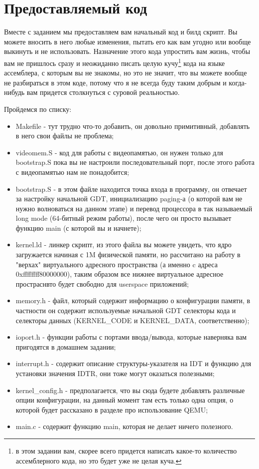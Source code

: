 \section{Предоставляемый код}

Вместе с заданием мы предоставляем вам начальный код и билд скрипт. Вы можете
вносить в него любые изменения, пытать его как вам угодно или вообще выкинуть и
не использовать. Назначение этого кода упростить вам жизнь, чтобы вам не
пришлось сразу и неожиданно писать целую кучу\footnote{в этом задании вам,
скорее всего придется написать какое-то количество ассемблерного кода, но это
будет уже не целая куча.} кода на языке ассемблера, с которым вы не знакомы, но
это не значит, что вы можете вообще не разбираться в этом коде, потому что я не
всегда буду таким добрым и когда-нибудь вам придется столкнуться с суровой
реальностью.

Пройдемся по списку:
\begin{itemize}
  \item Makefile - тут трудно что-то добавить, он довольно примитивный,
        добавлять в него свои файлы не проблема;
  \item videomem.S - код для работы с видеопамятью, он нужен только для
        bootstrap.S пока вы не настроили последовательный порт, после этого
        работа с видеопамятью нам не понадобится;
  \item bootstrap.S - в этом файле находится точка входа в программу, он
        отвечает за настройку начальной GDT, инициализацию paging-а (о которой
        вам не нужно волноваться на данном этапе) и перевод процессора в так
        называемый long mode (64-битный режим работы), после чего он просто
        вызывает функцию main (с которой вы и начнете);
  \item kernel.ld - линкер скрипт, из этого файла вы можете увидеть, что ядро
        загружается начиная с 1M физической памяти, но рассчитано на работу в
        "верхах" виртуального адресного пространства (а именно c адреса
        0xffffffff80000000), таким образом все нижнее виртуальное адресное
        простраснвто будет свободно для userspace приложений;
  \item memory.h - файл, который содержит информацию о конфигурации памяти,
        в частности он содержит используемые начальной GDT селекторы кода и
        селекторы данных (KERNEL\_CODE и KERNEL\_DATA, соответственно);
  \item ioport.h - функции работы с портами ввода/вывода, которые наверняка вам
        пригодятся в домашнем задании;
  \item interrupt.h - содержит описание структуры-указателя на IDT и функцию
        для установки значения IDTR, они тоже могут оказаться полезными;
  \item kernel\_config.h - предполагается, что вы сюда будете добавлять
        различные опции конфигурации, на данный момент там есть только одна
        опция, о которой будет рассказано в разделе про использование QEMU;
  \item main.c - содержит функцию main, которая не делает ничего полезного.
\end{itemize}
